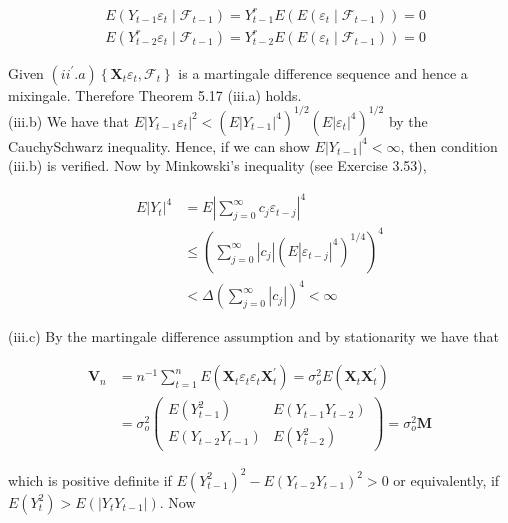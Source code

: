 \documentclass[10pt]{article}
\begin{document}
$$
\begin{aligned}
& E\left(Y_{t-1} \varepsilon_{t} \mid \mathcal{F}_{t-1}\right)=Y_{t-1}^{r} E\left(E\left(\varepsilon_{t} \mid \mathcal{F}_{t-1}\right)\right)=0 \\
& E\left(Y_{t-2}^{r} \varepsilon_{t} \mid \mathcal{F}_{t-1}\right)=Y_{t-2}^{r} E\left(E\left(\varepsilon_{t} \mid \mathcal{F}_{t-1}\right)\right)=0
\end{aligned}
$$

Given $\left(i i^{\prime} . a\right)\left\{\mathbf{X}_{t} \varepsilon_{t}, \mathcal{F}_{t}\right\}$ is a martingale difference sequence and hence a mixingale. Therefore Theorem 5.17 (iii.a) holds.\\
(iii.b) We have that $E\left|Y_{t-1} \varepsilon_{t}\right|^{2}<\left(E\left|Y_{t-1}\right|^{4}\right)^{1 / 2}\left(E\left|\varepsilon_{t}\right|^{4}\right)^{1 / 2}$ by the CauchySchwarz inequality. Hence, if we can show $E\left|Y_{t-1}\right|^{4}<\infty$, then condition (iii.b) is verified. Now by Minkowski's inequality (see Exercise 3.53),

$$
\begin{aligned}
E\left|Y_{t}\right|^{4} & =E\left|\sum_{j=0}^{\infty} c_{j} \varepsilon_{t-j}\right|^{4} \\
& \leq\left(\sum_{j=0}^{\infty}\left|c_{j}\right|\left(E\left|\varepsilon_{t-j}\right|^{4}\right)^{1 / 4}\right)^{4} \\
& <\Delta\left(\sum_{j=0}^{\infty}\left|c_{j}\right|\right)^{4}<\infty
\end{aligned}
$$

(iii.c) By the martingale difference assumption and by stationarity we have that

$$
\begin{aligned}
\mathbf{V}_{n} & =n^{-1} \sum_{t=1}^{n} E\left(\mathbf{X}_{t} \varepsilon_{t} \varepsilon_{t} \mathbf{X}_{t}^{\prime}\right)=\sigma_{o}^{2} E\left(\mathbf{X}_{t} \mathbf{X}_{t}^{\prime}\right) \\
& =\sigma_{o}^{2}\left(\begin{array}{cc}
E\left(Y_{t-1}^{2}\right) & E\left(Y_{t-1} Y_{t-2}\right) \\
E\left(Y_{t-2} Y_{t-1}\right) & E\left(Y_{t-2}^{2}\right)
\end{array}\right)=\sigma_{o}^{2} \mathbf{M}
\end{aligned}
$$

which is positive definite if $E\left(Y_{t-1}^{2}\right)^{2}-E\left(Y_{t-2} Y_{t-1}\right)^{2}>0$ or equivalently, if $E\left(Y_{t}^{2}\right)>E\left(\left|Y_{t} Y_{t-1}\right|\right)$. Now
\end{document}
